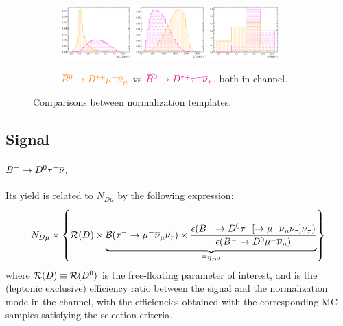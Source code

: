 \begin{figure}[!htb]
    \begin{subfigure}{\textwidth}
        \centering
        \includegraphics[width=0.3\textwidth]{figs-fit-fit-templates/histo-comp/Dst_iso_DstTau__vs__Dst_iso_DstMu__m2miss.pdf}
        \includegraphics[width=0.3\textwidth]{figs-fit-fit-templates/histo-comp/Dst_iso_DstTau__vs__Dst_iso_DstMu__el.pdf}
        \includegraphics[width=0.3\textwidth]{figs-fit-fit-templates/histo-comp/Dst_iso_DstTau__vs__Dst_iso_DstMu__q2.pdf}
        \caption{
            $\textcolor{orange}{{{\kern 0.18em\overline{\kern -0.18em B}}{}^0} \rightarrow {\ensuremath{{D}^{*+}}}{\ensuremath{\mu^-}}{\ensuremath{{\overline{\nu}}_\mu}}}$ vs
            $\textcolor{magenta}{{{\kern 0.18em\overline{\kern -0.18em B}}{}^0} \rightarrow {\ensuremath{{D}^{*+}}}{\ensuremath{\tau^-}}{\ensuremath{{\overline{\nu}}_\tau}}}$,
            both in \Dstar channel.
        }
    \end{subfigure}

    \caption{
        Comparisons between normalization templates.
    }
    \label{fig:d0-norm-vs-dst-norm}
\end{figure}


\subsection{Signal}
\label{tmpl:sig}

\paragraph{${{{B}^-}} \rightarrow {\ensuremath{{D}^0}}{\ensuremath{\tau^-}}{\ensuremath{{\overline{\nu}}_\tau}}$}
Its yield is related to $N_{D\mu}$ by the following expression:
\begin{equation}
    N_{D\mu} \times \left\{
        \RD \times \underbrace{
            \BRTauToMu \times
            \frac{
                \epsilon{(\Bm \rightarrow \Dz \taum [\rightarrow \mun\neumb\neut] \neutb)}
            }{
                \epsilon({\Bm \rightarrow \Dz \mun \neumb})
            }
        }_{\equiv \fitRDEff}
    \right\}
\end{equation}
where $\mathcal{R}(D) \equiv \mathcal{R}(D^0)$ is the free-floating parameter of interest,
and \fitRDEff is the (\tauon leptonic exclusive) efficiency ratio between the
signal and the normalization mode in the \Dz channel,
with the efficiencies obtained with the corresponding MC samples satisfying
the \Dz\muon selection criteria.

